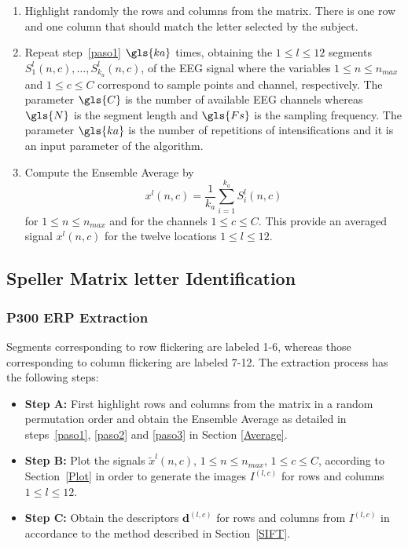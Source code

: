 \begin{itemize}
\begin{enumerate}
\item \label{paso1}Highlight randomly the rows and columns from the matrix.  There is one row and one column that should match the letter selected by the subject.
\item  \label{paso2} Repeat step~\ref{paso1} $\gls{ka}$ times, obtaining the $1 \leq l \leq 12$ segments $S_1^l(n,c),\dots,S_{k_a}^l(n,c)$, of the EEG signal where the variables $1 \leq n \leq n_{max}$ and $1 \leq c \leq C$  correspond to sample points and channel, respectively. The parameter $\gls{C}$ is the number of available EEG channels whereas $\gls{N}$ is the segment length and $\gls{Fs}$ is the sampling frequency.  The parameter $\gls{ka}$ is the number of repetitions of intensifications and it is an input parameter of the algorithm.
\item \label{paso3} Compute the Ensemble Average by
\begin{equation}
x^l(n,c)= \frac{1}{k_a}\sum_{i=1}^{k_a}S_i^l(n,c) 
\label{averaging}
\end{equation}  
for $1 \leq n \leq n_{max}$ and for the channels $1 \leq c \leq C$.  This provide an averaged signal $x^l(n,c)$ for the twelve locations $ 1 \leq l \leq 12$.
\end{enumerate}
\end{itemize}


\subsection{Speller Matrix letter Identification}
\label{Classification}

\subsubsection{P300 ERP Extraction}
Segments corresponding to row flickering are labeled 1-6, whereas those corresponding to column flickering are labeled 7-12.  The extraction process has the following steps:

\begin{itemize}

\item \textbf{Step A:}\label{pasoa} First highlight rows and columns from the matrix in a random permutation order and obtain the Ensemble Average as detailed in steps~\ref{paso1}, \ref{paso2} and \ref{paso3} in Section \ref{Average}.
\item \textbf{Step B:}\label{paso4} Plot the signals $\tilde{x}^l(n,c)$,  $1 \leq n \leq n_{max}$, $1 \leq c \leq C $,  according to Section~\ref{Plot} in order to generate the images $I^{(l,c)}$ for rows and columns $1 \leq l \leq 12$.

\item \textbf{Step C:} Obtain the descriptors $ \mathbf{d}^{(l,c)}$ for rows and columns from $I^{(l,c)}$  in accordance to the method described in Section~\ref{SIFT}. 

\end{itemize}

